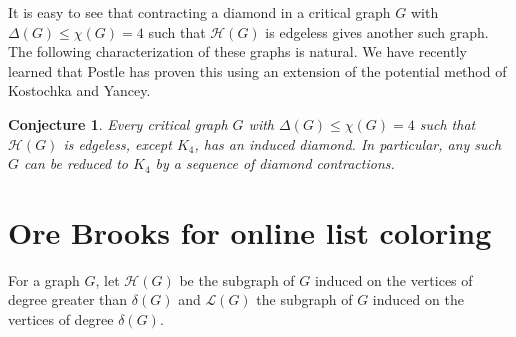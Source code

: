 \documentclass[12pt]{article}
\theoremstyle{plain}
\newtheorem{conjecture}[thm]{Conjecture}
\theoremstyle{definition}
\theoremstyle{remark}
\newcommand{\fancy}[1]{\mathcal{#1}}
\renewcommand{\L}{\fancy{L}}
\newcommand{\HH}{\fancy{H}}
\newcommand{\set}[1]{\left\{ #1 \right\}}
\newcommand{\irange}[1]{\left[#1\right]}
\begin{document}

It is easy to see that contracting a diamond in a critical graph $G$ with $\Delta(G) \leq \chi(G) = 4$ such that $\HH(G)$ is edgeless gives another such graph.  The following characterization of these graphs is natural.  We have recently learned that Postle has proven this using an extension of the potential method of Kostochka and Yancey.

\begin{conjecture}\label{ContractionConjecture}
Every critical graph $G$ with $\Delta(G) \leq \chi(G) = 4$ such that $\HH(G)$ is edgeless, except $K_4$, has an induced diamond. In particular, any such $G$ can be reduced to $K_4$ by a sequence of diamond contractions.
\end{conjecture}

\section{Ore Brooks for online list coloring}
For a graph $G$, let $\HH(G)$ be the subgraph of $G$ induced on the vertices of degree greater than $\delta(G)$ and $\L(G)$ the subgraph of $G$ induced on the vertices of degree $\delta(G)$.
\end{document}
